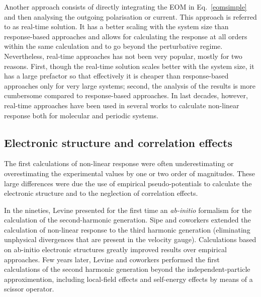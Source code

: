 Another approach consists of directly integrating the EOM in Eq.~\ref{eomsimple}  and then analysing the outgoing polarisation or current. This approach is referred to as real-time solution. It has a better scaling with the system size than response-based approaches and allows for calculating the response at all orders within the same calculation and to go beyond the perturbative regime. Nevertheless, real-time approaches has not been very popular, mostly for two reasons. First, though the real-time solution scales better with the system size, it has a large prefactor so that effectively it is cheaper than response-based approaches only for very large systems; second, the analysis of the results is more cumbersome compared to response-based approaches. In last decades, however, real-time approaches have been used in several works to calculate non-linear response both for molecular\cite{takimoto:154114,ding2013efficient} and periodic systems.\cite{goncharov2013nonlinear}


\subsection{Electronic structure and correlation effects}
The first calculations of non-linear response were often underestimating or overestimating the experimental values by one or two order of magnitudes.\cite{PhysRevB.12.2325,PhysRevB.36.9708}
These large differences were due the use of empirical pseudo-potentials to calculate the electronic structure and to the neglection of correlation effects.  

In the nineties, Levine\cite{PhysRevB.42.3567} presented for the first time an \emph{ab-initio} formalism for the calculation of the second-harmonic generation. Sipe and coworkers extended the calculation of non-linear response to the third harmonic generation\cite{PhysRevB.61.5337,PhysRevB.48.11705} (eliminating unphysical divergences that are present in the velocity gauge). Calculations based on ab-initio electronic structures greatly improved results over empirical approaches. Few years later, Levine and coworkers performed the first calculations of the second harmonic generation beyond the independent-particle approximention, including local-field effects and self-energy effects by means of a scissor operator.\cite{PhysRevLett.63.1719,PhysRevB.56.1787} 

